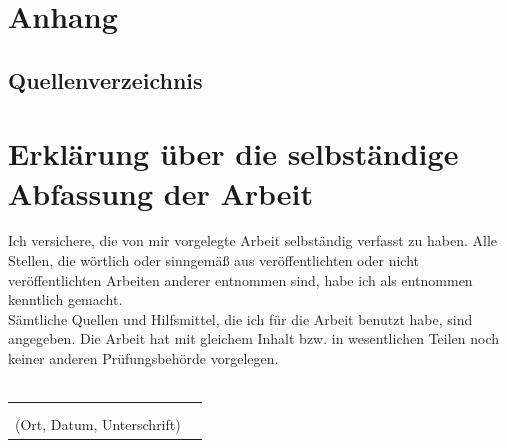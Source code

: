 \documentclass[a4paper,12pt,oneside]{article}
\begin{document}
  \section{Anhang}
    \subsection{Quellenverzeichnis}
      \printbibliography
  
  \newpage
  \pagestyle{empty}
  \section*{Erklärung über die selbständige\\Abfassung der Arbeit}
    Ich versichere, die von mir vorgelegte Arbeit selbständig verfasst zu haben.
    Alle Stellen, die wörtlich oder sinngemäß aus veröffentlichten oder nicht veröffentlichten Arbeiten anderer entnommen sind,
    habe ich als entnommen kenntlich gemacht.\\ 
    Sämtliche Quellen und Hilfsmittel, die ich für die Arbeit benutzt habe, sind
    angegeben. Die Arbeit hat mit gleichem Inhalt bzw. in wesentlichen Teilen noch keiner anderen Prüfungsbehörde vorgelegen.\\\\
    \begin{tabular}{cp{7cm}}
      & \\ 
      & \\ \hline
      \small (Ort, Datum, Unterschrift) & \normalsize \\
    \end{tabular}
  
  \newpage

  \thispagestyle{empty}
  
\end{document}
